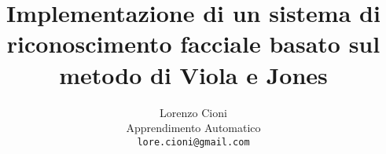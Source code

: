\documentclass[10pt,twocolumn,letterpaper]{article}
\begin{document}
\title{Implementazione di un sistema di riconoscimento facciale basato sul metodo di Viola e Jones}

\author{Lorenzo Cioni\\
Apprendimento Automatico\\
{\tt\small lore.cioni@gmail.com}}

\maketitle
\thispagestyle{empty}












{\small


}
\end{document}
